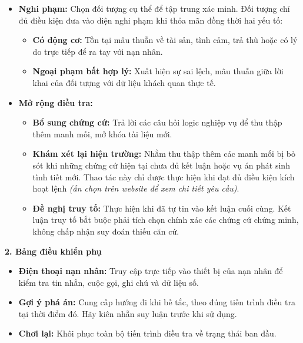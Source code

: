 \documentclass[12pt,a4paper]{article}
\begin{document}
\begin{itemize}[leftmargin=*, itemsep=2pt, topsep=2pt, parsep=0pt]
  \item \textbf{Nghi phạm:} Chọn đối tượng cụ thể để tập trung xác minh. Đối tượng chỉ đủ điều kiện đưa vào diện nghi phạm khi thỏa mãn đồng thời hai yếu tố:
\begin{itemize}[leftmargin=*, itemsep=2pt, topsep=2pt, parsep=0pt]
  \item \textbf{Có động cơ:} Tồn tại mâu thuẫn về tài sản, tình cảm, trả thù hoặc có lý do trực tiếp để ra tay với nạn nhân.
  \item \textbf{Ngoại phạm bất hợp lý:} Xuất hiện sự sai lệch, mâu thuẫn giữa lời khai của đối tượng với dữ liệu khách quan thực tế.

\end{itemize}
  \item \textbf{Mở rộng điều tra:}
\begin{itemize}[leftmargin=*, itemsep=2pt, topsep=2pt, parsep=0pt]
  \item \textbf{Bổ sung chứng cứ:} Trả lời các câu hỏi logic nghiệp vụ để thu thập thêm manh mối, mở khóa tài liệu mới.
  \item \textbf{Khám xét lại hiện trường:} Nhằm thu thập thêm các manh mối bị bỏ sót khi những chứng cứ hiện tại chưa đủ kết luận hoặc vụ án phát sinh tình tiết mới. Thao tác này chỉ được thực hiện khi đạt đủ điều kiện kích hoạt lệnh \textit{(ấn chọn trên website để xem chi tiết yêu cầu)}.
  \item \textbf{Đề nghị truy tố:} Thực hiện khi đã tự tin vào kết luận cuối cùng. Kết luận truy tố bắt buộc phải tích chọn chính xác các chứng cứ chứng minh, không chấp nhận suy đoán thiếu căn cứ.

\end{itemize}
\end{itemize}

\vspace{0.2cm}\noindent\textbf{2. Bảng điều khiển phụ}\\[0.1cm]


\begin{itemize}[leftmargin=*, itemsep=2pt, topsep=2pt, parsep=0pt]
  \item \textbf{Điện thoại nạn nhân:} Truy cập trực tiếp vào thiết bị của nạn nhân để kiểm tra tin nhắn, cuộc gọi, ghi chú và dữ liệu số.
  \item \textbf{Gợi ý phá án:} Cung cấp hướng đi khi bế tắc, theo đúng tiến trình điều tra tại thời điểm đó. Hãy kiên nhẫn suy luận trước khi sử dụng.
  \item \textbf{Chơi lại:} Khôi phục toàn bộ tiến trình điều tra về trạng thái ban đầu.
\end{itemize}
\end{document}
